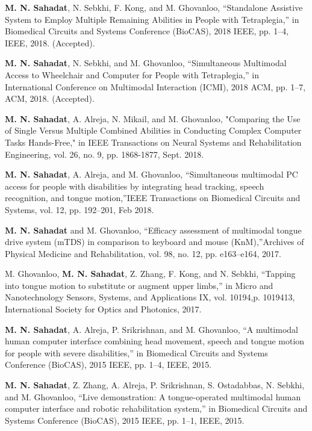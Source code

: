 \begin{cvitems}
\item {\textbf{M. N. Sahadat}, N. Sebkhi, F. Kong, and M. Ghovanloo, “Standalone Assistive System to Employ Multiple Remaining Abilities in People with Tetraplegia,” in Biomedical Circuits and Systems Conference (BioCAS), 2018 IEEE, pp. 1–4, IEEE, 2018. (Accepted).}
\item {\textbf{M. N. Sahadat}, N. Sebkhi, and M. Ghovanloo, “Simultaneous Multimodal Access to Wheelchair and Computer for People with Tetraplegia,” in International Conference on Multimodal Interaction (ICMI), 2018 ACM, pp. 1–7, ACM, 2018. (Accepted).}
\item {\textbf{M. N. Sahadat}, A. Alreja, N. Mikail, and M. Ghovanloo, "Comparing the Use of Single Versus Multiple Combined Abilities in Conducting Complex Computer Tasks Hands-Free," in IEEE Transactions on Neural Systems and Rehabilitation Engineering, vol. 26, no. 9, pp. 1868-1877, Sept. 2018.}
\item {\textbf{M. N. Sahadat}, A. Alreja, and M. Ghovanloo, “Simultaneous multimodal PC access for people with disabilities by integrating head tracking, speech recognition,  and tongue motion,”IEEE  Transactions  on  Biomedical  Circuits and Systems, vol. 12, pp. 192–201, Feb 2018.}
\item {\textbf{M. N. Sahadat}  and  M.  Ghovanloo,  “Efficacy  assessment  of  multimodal tongue drive system (mTDS) in comparison to keyboard and mouse (KnM),”Archives of Physical Medicine and Rehabilitation, vol. 98, no. 12, pp. e163–e164, 2017.}
\item { M. Ghovanloo, \textbf{M. N. Sahadat}, Z. Zhang, F. Kong, and N. Sebkhi, “Tapping into tongue motion to substitute or augment upper limbs,” in Micro and  Nanotechnology  Sensors,  Systems,  and  Applications  IX,  vol.  10194,p. 1019413, International Society for Optics and Photonics, 2017.}
\item {\textbf{M. N. Sahadat},  A. Alreja,  P. Srikrishnan,  and M. Ghovanloo,  “A multimodal human computer interface combining head movement,  speech and tongue motion for people with severe disabilities,” in Biomedical Circuits and Systems Conference (BioCAS), 2015 IEEE, pp. 1–4, IEEE, 2015.}
\item{\textbf{M. N. Sahadat}, Z. Zhang, A. Alreja, P. Srikrishnan, S. Ostadabbas, N. Sebkhi,  and  M.  Ghovanloo,  “Live  demonstration:  A  tongue-operated  multimodal human computer interface and robotic rehabilitation system,” in Biomedical Circuits and Systems Conference (BioCAS), 2015 IEEE, pp. 1–1, IEEE, 2015.}

\end{cvitems}
